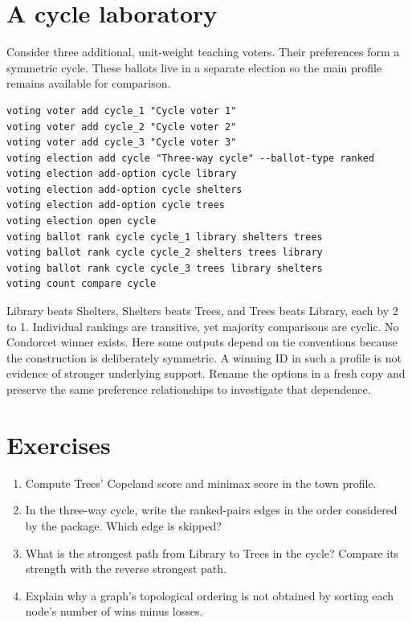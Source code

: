 \section{A cycle laboratory}
Consider three additional, unit-weight teaching voters. Their preferences form a symmetric cycle. These ballots live in a separate election so the main profile remains available for comparison.
\begin{lstlisting}[style=votingrun]
voting voter add cycle_1 "Cycle voter 1"
voting voter add cycle_2 "Cycle voter 2"
voting voter add cycle_3 "Cycle voter 3"
voting election add cycle "Three-way cycle" --ballot-type ranked
voting election add-option cycle library
voting election add-option cycle shelters
voting election add-option cycle trees
voting election open cycle
voting ballot rank cycle cycle_1 library shelters trees
voting ballot rank cycle cycle_2 shelters trees library
voting ballot rank cycle cycle_3 trees library shelters
voting count compare cycle
\end{lstlisting}
Library beats Shelters, Shelters beats Trees, and Trees beats Library, each by 2 to 1. Individual rankings are transitive, yet majority comparisons are cyclic. No Condorcet winner exists.
Here some outputs depend on tie conventions because the construction is deliberately symmetric. A winning ID in such a profile is not evidence of stronger underlying support. Rename the options in a fresh copy and preserve the same preference relationships to investigate that dependence.

\section{Exercises}
\begin{enumerate}
\item Compute Trees' Copeland score and minimax score in the town profile.
\item In the three-way cycle, write the ranked-pairs edges in the order considered by the package. Which edge is skipped?
\item What is the strongest path from Library to Trees in the cycle? Compare its strength with the reverse strongest path.
\item Explain why a graph's topological ordering is not obtained by sorting each node's number of wins minus losses.
\end{enumerate}
